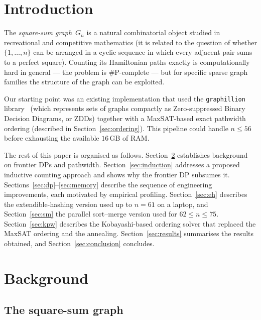\documentclass[12pt]{article}
\theoremstyle{definition}
\newcommand{\Gn}{G_n}
\begin{document}
\section{Introduction}

The \emph{square-sum graph}~$\Gn$ is a natural combinatorial object studied
in recreational and competitive mathematics (it is related to the question of
whether $\{1,\ldots,n\}$ can be arranged in a cyclic sequence in which every
adjacent pair sums to a perfect square).
Counting its Hamiltonian paths exactly is computationally hard in general — the
problem is \#P-complete — but for specific sparse graph families the structure
of the graph can be exploited.

Our starting point was an existing implementation that used the
\texttt{graphillion} library~\cite{graphillion} (which represents sets of
graphs compactly as Zero-suppressed Binary Decision Diagrams, or ZDDs) together
with a MaxSAT-based exact pathwidth ordering (described in
Section~\ref{sec:ordering}).
This pipeline could handle $n \le 56$ before exhausting the available $16$\,GB
of RAM.

The rest of this paper is organised as follows.
Section~\ref{sec:background} establishes background on frontier DPs and
pathwidth.
Section~\ref{sec:induction} addresses a proposed inductive counting approach
and shows why the frontier DP subsumes it.
Sections~\ref{sec:dp}--\ref{sec:memory} describe the sequence of
engineering improvements, each motivated by empirical profiling.
Section~\ref{sec:eh} describes the extendible-hashing version used up to
$n=61$ on a laptop, and Section~\ref{sec:sm} the parallel sort--merge version
used for $62\le n\le 75$.
Section~\ref{sec:kpw} describes the Kobayashi-based ordering solver that
replaced the MaxSAT ordering and the annealing.
Section~\ref{sec:results} summarises the results obtained, and
Section~\ref{sec:conclusion} concludes.

\section{Background}
\label{sec:background}

\subsection{The square-sum graph}
\end{document}

